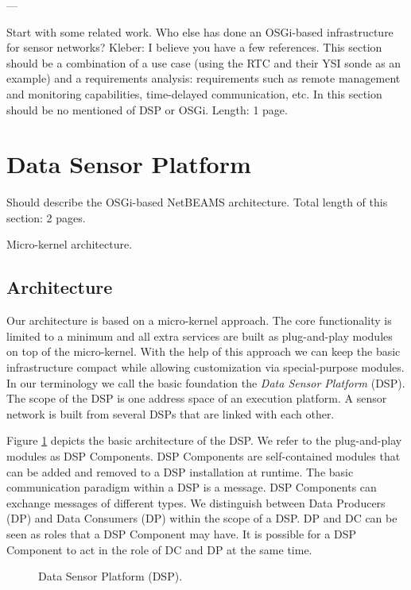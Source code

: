 \documentclass[conference]{IEEEtran}
\begin{document}
---

Start with some related work. Who else has done an OSGi-based
infrastructure for sensor networks? Kleber: I believe you have a few
references. This section should be a combination of a use case (using
the RTC and their YSI sonde as an example) and a requirements
analysis: requirements such as remote management and monitoring
capabilities, time-delayed communication, etc. In this section should
be no mentioned of DSP or OSGi. Length: 1 page.

\section{Data Sensor Platform}

Should describe the OSGi-based NetBEAMS architecture. Total length of
this section: 2 pages.

Micro-kernel architecture.

\subsection{Architecture}

Our architecture is based on a micro-kernel approach. The core
functionality is limited to a minimum and all extra services are built
as plug-and-play modules on top of the micro-kernel. With the help of
this approach we can keep the basic infrastructure compact while
allowing customization via special-purpose modules. In our terminology
we call the basic foundation the \emph{Data Sensor Platform}
(DSP). The scope of the DSP is one address space of an execution
platform. A sensor network is built from several DSPs that are linked
with each other.

Figure \ref{FIG_DSP} depicts the basic architecture of the
DSP. We refer to the plug-and-play modules as DSP Components. DSP
Components are self-contained modules that can be added and removed to
a DSP installation at runtime. The basic communication paradigm within
a DSP is a message. DSP Components can exchange messages of different
types. We distinguish between Data Producers (DP) and Data Consumers
(DP) within the scope of a DSP. DP and DC can be seen as roles that a
DSP Component may have. It is possible for a DSP Component to act in
the role of DC and DP at the same time.


\begin{figure}
\centering
{}
\caption{\label{FIG_DSP} Data Sensor Platform (DSP).}
\end{figure}
\end{document}
